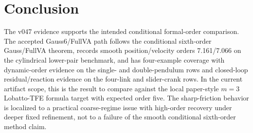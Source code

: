\documentclass[11pt]{article}
\newcommand{\method}{Gauss6/FullVA}
\newcommand{\tfe}{TFE}
\begin{document}
\section{Conclusion}

The v047 evidence supports the intended conditional formal-order comparison.  The accepted
\method{} path follows the conditional sixth-order Gauss/FullVA theorem,
records smooth position/velocity orders 7.161/7.066 on the cylindrical
lower-pair benchmark, and has four-example coverage with dynamic-order
evidence on the single- and double-pendulum rows and closed-loop
residual/reaction evidence on the
four-link and slider-crank rows.  In the current artifact scope, this is the
result to compare against the local paper-style $m=3$
Lobatto-\tfe{} formula target with expected order five.  The sharp-friction
behavior is localized to a practical coarse-regime issue with high-order
recovery under deeper fixed refinement, not to a failure of the smooth
conditional sixth-order method claim.
\end{document}

